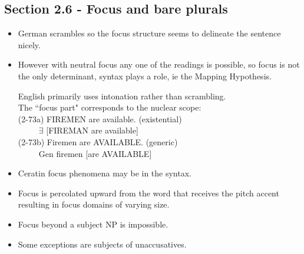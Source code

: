\documentclass[landscape]{article}
\begin{document}
\subsection*{ Section 2.6 - Focus and bare plurals}

\begin{itemize}
\item German scrambles so the focus structure seems to delineate the sentence nicely. 

\item However with neutral focus any one of the readings is possible, so focus is  not the only determinant, syntax plays a role, ie the Mapping Hypothesis.

\begin{example}English primarily uses intonation rather than scrambling.\\
 The ``focus part" corresponds to the nuclear scope:\\

(2-73a) FIREMEN are available. (existential)\\
~  ~ ~ $\exists$ [FIREMAN are available]\\
(2-73b) Firemen are AVAILABLE. (generic)\\
~  ~ ~ Gen firemen [are AVAILABLE]\\
\end{example}

\item Ceratin focus phenomena may  be in the syntax. 

\item Focus is percolated upward from the word that receives the pitch accent resulting in focus domains of varying size.


\item  Focus beyond a subject NP is impossible.
\item Some exceptions are subjects of unaccusatives.


\end{itemize}
\end{document}
